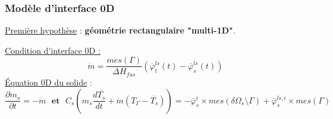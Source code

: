 \documentclass{beamer}
\renewcommand{\frac}{\dfrac}
\begin{document}
\begin{frame}
    \frametitle{Modèle d'interface 0D}
   \footnotesize
   \underline{Première hypothèse} : \textbf{géométrie rectangulaire "multi-1D"}.\\
   \vspace{0.3cm}

 \color{cea_rouge} \underline{Condition d'interface 0D :}  \color{cea_texte} $$ \dot{m} =  \frac{mes(\Gamma)}{\Delta H_{fus}} (\overline{\varphi}_l^{ls}(t) -\overline{\varphi}_s^{ls}(t))$$
\color{cea_rouge} \underline{Équation 0D du solide} : \color{cea_texte} $$ \frac{\partial m_s}{\partial t} = -\dot{m} \, \, \textbf{ et }  \, \, C_s (m_s \frac{d\overline{T_s}}{dt} + \dot{m} (T_{\Gamma} - \overline{T_s} )) = -\overline{\varphi}^i_s \times mes(\delta \Omega_s \setminus \Gamma)    + \overline{\varphi}^{ls, i}_s \times mes(\Gamma) $$


\end{frame}
\end{document}
